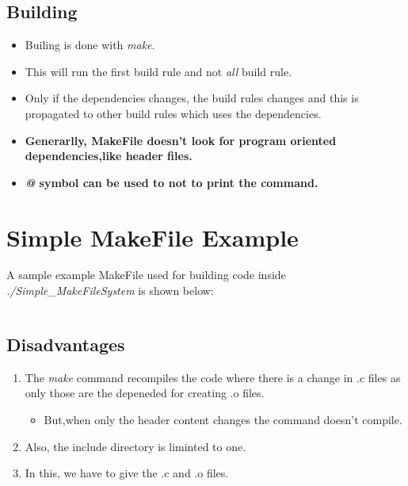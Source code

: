 \documentclass{article}
\begin{document}
\subsection{Building}
\begin{itemize}
    \item Builing is done with \emph{make}.
    \item This will run the first build rule and not \emph{all} build rule.
    \item Only if the dependencies changes, the build rules changes and this is propagated to other build rules which uses the dependencies.
    \item \textbf{Generarlly, MakeFile doesn't look for program oriented dependencies,like header files.}
    \item \textbf{\emph{@} symbol can be used to not to print the command.}
\end{itemize}



\section{Simple MakeFile Example}
\quad A sample example MakeFile used for building code inside \emph{./Simple\_MakeFileSystem} is shown below:


\inputminted[linenos, breaklines, frame=lines]{make}{./Simple_MakeFileSystem/Makefile}

\subsection{Disadvantages}
\begin{enumerate}[label=\Roman*)]
    \item The \emph{make} command recompiles the code where there is a change in .c files as only those are the depeneded for creating .o files.
          \begin{itemize}
              \item But,when only the header content changes the command doesn't compile.
          \end{itemize}
    \item Also, the include directory is liminted to one.
    \item In this, we have to give the .c and .o files.
\end{enumerate}
\end{document}

